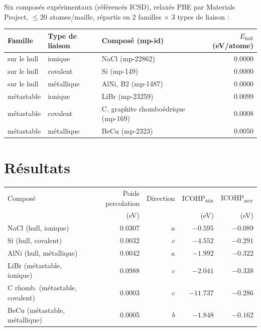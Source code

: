 \documentclass[11pt,a4paper]{article}
\begin{document}
Six composés expérimentaux (référencés ICSD), relaxés PBE par Materials
Project, $\leq 20$ atomes/maille, répartis en 2 familles $\times$ 3 types
de liaison :

\begin{center}
\begin{tabular}{@{}lllr@{}}
\toprule
Famille & Type de liaison & Composé (mp-id) & $E_\text{hull}$ (eV/atome) \\
\midrule
sur le hull   & ionique    & NaCl (mp-22862)              & 0.0000 \\
sur le hull   & covalent   & Si (mp-149)                  & 0.0000 \\
sur le hull   & métallique & AlNi, B2 (mp-1487)           & 0.0000 \\
métastable    & ionique    & LiBr (mp-23259)               & 0.0099 \\
métastable    & covalent   & C, graphite rhomboédrique (mp-169) & 0.0008 \\
métastable    & métallique & BeCu (mp-2323)                & 0.0050 \\
\bottomrule
\end{tabular}
\end{center}

\section{Résultats}

\begin{center}
\small
\begin{tabular}{@{}lrrrr@{}}
\toprule
Composé & Poids percolation & Direction & $\text{ICOHP}_\text{min}$ & $\text{ICOHP}_\text{moy}$ \\
        & (eV) & & (eV) & (eV) \\
\midrule
NaCl (hull, ionique)      & 0.0307 & $a$ & $-0.595$  & $-0.089$ \\
Si (hull, covalent)       & 0.0032 & $c$ & $-4.552$  & $-0.291$ \\
AlNi (hull, métallique)   & 0.0042 & $a$ & $-1.992$  & $-0.322$ \\
LiBr (métastable, ionique)     & 0.0988 & $c$ & $-2.041$  & $-0.338$ \\
C rhomb. (métastable, covalent) & 0.0003 & $c$ & $-11.737$ & $-0.286$ \\
BeCu (métastable, métallique)   & 0.0005 & $b$ & $-1.848$ & $-0.162$ \\
\bottomrule
\end{tabular}
\end{center}
\end{document}
